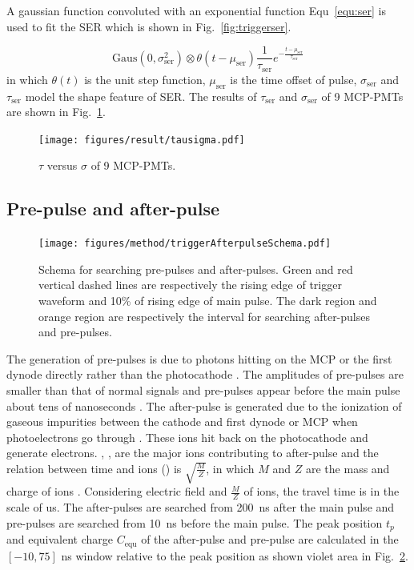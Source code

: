 A gaussian function convoluted with an exponential function Equ~\eqref{equ:ser} is used to fit the SER which is shown in Fig.~\ref{fig:triggerser}.

\begin{equation}
    \label{equ:ser}
    \mathrm{Gaus}(0,\sigma_{\mathrm{ser}}^2)\otimes\theta(t-\mu_{\mathrm{ser}})\frac{1}{\tau_{\mathrm{ser}}}e^{-\frac{t-\mu_{\mathrm{ser}}}{\tau_{\mathrm{ser}}}}
\end{equation}
in which $\theta(t)$ is the unit step function, $\mu_{\mathrm{ser}}$ is the time offset of pulse, $\sigma_{\mathrm{ser}}$ and $\tau_{\mathrm{ser}}$ model the shape feature of SER. The results of $\tau_{\mathrm{ser}}$ and $\sigma_{\mathrm{ser}}$ of 9 MCP-PMTs are shown in Fig.~\ref{fig:sigmaCompare}.
\begin{figure}[!htbp]
    \centering
    \texttt{[image: figures/result/tausigma.pdf]}
    \caption{$\tau$ versus $\sigma$ of 9 MCP-PMTs.}
    \label{fig:sigmaCompare}
\end{figure}


\subsection{Pre-pulse and after-pulse}
\label{sec:afterpulse}
\begin{figure}
    \centering
    \texttt{[image: figures/method/triggerAfterpulseSchema.pdf]}
    \caption{Schema for searching pre-pulses and after-pulses. Green and red vertical dashed lines are respectively the rising edge of trigger waveform and 10\% of rising edge of main pulse. The dark region and orange region are respectively the interval for searching after-pulses and pre-pulses.}
    \label{fig:afterpulseSchema}
\end{figure}

The generation of pre-pulses is due to photons hitting on the MCP or the first dynode directly rather than the photocathode \cite{JUNOMassTesting}. The amplitudes of pre-pulses are smaller than that of normal signals and pre-pulses appear before the main pulse about tens of nanoseconds \cite{JUNOMassTesting}. The after-pulse is generated due to the ionization of gaseous impurities between the cathode and first dynode or MCP when photoelectrons go through \cite{Coates_1973}. These ions hit back on the photocathode and generate electrons. , ,  are the major ions contributing to after-pulse and the relation between time and ions () is $\sqrt{\frac{M}{Z}}$, in which $M$ and $Z$ are the mass and charge of ions \cite{Coates_1973,XENON1TTesting}. Considering electric field and $\frac{M}{Z}$ of ions, the travel time is in the scale of \si{us}. The after-pulses are searched from \SI{200}{ns} after the main pulse and pre-pulses are searched from \SI{10}{ns} before the main pulse. The peak position $t_p$ and equivalent charge $C_{\mathrm{equ}}$ of the after-pulse and pre-pulse are calculated in the $[-10,75]$ ns window relative to the peak position as shown violet area in Fig.~\ref{fig:afterpulseSchema}.

